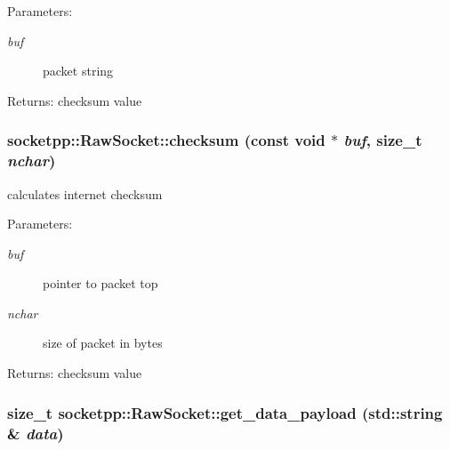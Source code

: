 \begin{Desc}
\item[Parameters:]
\begin{description}
\item[{\em buf}]packet string \end{description}
\end{Desc}
\begin{Desc}
\item[Returns:]checksum value \end{Desc}
\hypertarget{classsocketpp_1_1RawSocket_bb78ecebb5bd5ab5be4ee46d786fe5cd}{
\subsubsection[{checksum}]{ socketpp::RawSocket::checksum (const void $\ast$ {\em buf}, \/  size\_\-t {\em nchar})}}
\label{classsocketpp_1_1RawSocket_bb78ecebb5bd5ab5be4ee46d786fe5cd}


calculates internet checksum 

\begin{Desc}
\item[Parameters:]
\begin{description}
\item[{\em buf}]pointer to packet top \item[{\em nchar}]size of packet in bytes \end{description}
\end{Desc}
\begin{Desc}
\item[Returns:]checksum value \end{Desc}
\hypertarget{classsocketpp_1_1RawSocket_de47c63d60cba25d1ae82f242851610d}{
\subsubsection[{get\_\-data\_\-payload}]{\setlength{\rightskip}{0pt plus 5cm}size\_\-t socketpp::RawSocket::get\_\-data\_\-payload (std::string \& {\em data})}}
\label{classsocketpp_1_1RawSocket_de47c63d60cba25d1ae82f242851610d}


